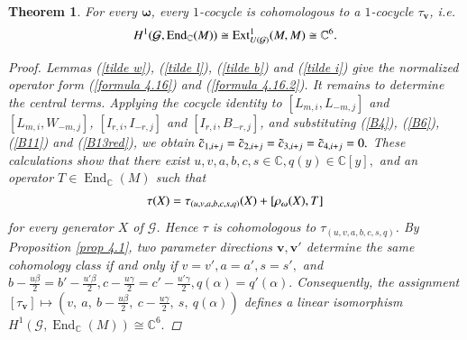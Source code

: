 \documentclass[12pt,reqno]{amsart}
\def\C{\mathbb{C}}
\numberwithin{equation}{section}
\newtheorem{theo}{Theorem}[section]
\begin{document}
\begin{theo}\label{theo 4.1}
    For every $\boldsymbol{\omega}$, every $1$-cocycle is cohomologous to a $1$-cocycle $\tau_{\boldsymbol{v}}$, i.e. 
\begin{equation}\label{formula 4.17}
\aligned
H^1(\mathcal{G},\operatorname{End}_{\C}(M))\cong \operatorname{Ext}^1_{U(\mathcal{G})}(M,M)\cong \C^6.
\endaligned
\end{equation} 
\begin{proof}
Lemmas (\ref{tilde w}), (\ref{tilde l}), (\ref{tilde b}) and (\ref{tilde i}) give the normalized operator form (\ref{formula 4.16}) and (\ref{formula 4.16.2}).
It remains to determine the central terms. Applying the
cocycle identity to  $[L_{m,i},L_{-m,j}]$ and
$[L_{m,i},W_{-m,j}]$, 
$[I_{r,i},I_{-r,j}]$ and $[I_{r,i},B_{-r,j}]$, and substituting (\ref{B4}), (\ref{B6}), (\ref{B11}) and (\ref{B13red}), we obtain 
   $\Tilde c_{1,i+j}
=\Tilde c_{2,i+j}
=\Tilde c_{3,i+j}
=\Tilde c_{4,i+j}=0.$
These calculations show that there exist $u,v,a,b,c,s\in\mathbb C, q(y)\in\mathbb C[y],$
and an operator $T\in\operatorname{End}_{\mathbb C}(M)$
such that
\begin{equation*}\label{formula 4.19.1}
\aligned
\tau(X)=\tau_{(u,v,a,b,c,s,q)}(X)
       +[\rho_{\boldsymbol{\omega}}(X),T]
\endaligned
\end{equation*} 
for every generator $X$ of $\mathcal G$. Hence $\tau$ is
cohomologous to 
$\tau_{(u,v,a,b,c,s,q)}$.
By Proposition \ref{prop 4.1}, two parameter directions $\boldsymbol{v},\boldsymbol{v}'$ determine the same
cohomology class if and only if $v=v', a=a', s=s',$
and $b-\frac{u\beta}{2}
=b'-\frac{u'\beta}{2},
c-\frac{u\gamma}{2}
=c'-\frac{u'\gamma}{2},
q(\alpha)=q'(\alpha).$
Consequently, the assignment 
$[\tau_{\boldsymbol{v}} ] \mapsto \left(
v,\ a,\ b-\frac{u\beta}{2},\
c-\frac{u\gamma}{2},\ s,\ q(\alpha)
\right)$
defines a linear isomorphism $H^1(\mathcal{G},\operatorname{End}_{\C}(M))\cong \C^6.$
\end{proof}



    
\end{theo}
\end{document}
